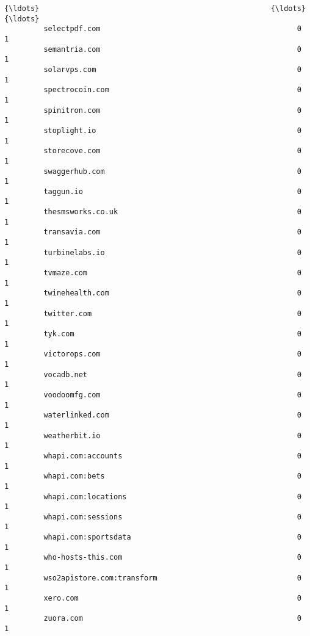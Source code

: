 \documentclass[11pt]{article}
\begin{document}
\begin{Verbatim}[commandchars=\\\{\}]
         {\ldots}                                                     {\ldots}      {\ldots}   
         selectpdf.com                                             0        1   
         semantria.com                                             0        1   
         solarvps.com                                              0        1   
         spectrocoin.com                                           0        1   
         spinitron.com                                             0        1   
         stoplight.io                                              0        1   
         storecove.com                                             0        1   
         swaggerhub.com                                            0        1   
         taggun.io                                                 0        1   
         thesmsworks.co.uk                                         0        1   
         transavia.com                                             0        1   
         turbinelabs.io                                            0        1   
         tvmaze.com                                                0        1   
         twinehealth.com                                           0        1   
         twitter.com                                               0        1   
         tyk.com                                                   0        1   
         victorops.com                                             0        1   
         vocadb.net                                                0        1   
         voodoomfg.com                                             0        1   
         waterlinked.com                                           0        1   
         weatherbit.io                                             0        1   
         whapi.com:accounts                                        0        1   
         whapi.com:bets                                            0        1   
         whapi.com:locations                                       0        1   
         whapi.com:sessions                                        0        1   
         whapi.com:sportsdata                                      0        1   
         who-hosts-this.com                                        0        1   
         wso2apistore.com:transform                                0        1   
         xero.com                                                  0        1   
         zuora.com                                                 0        1   
         

\end{Verbatim}
\end{document}

